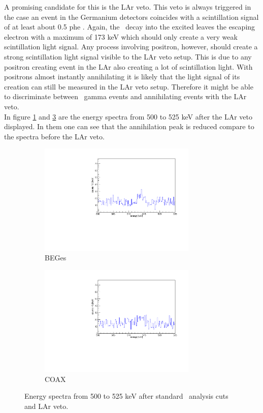 \documentclass[encoding=utf8,british]{tumphthesis}
\begin{document}
A promising candidate for this is the LAr veto.
This veto is always triggered in the case an event in the Germanium detectors coincides with a scintillation signal of at least about 0.5 phe \cite{agostini_background_2017}.
Again, the \Kr\ decay into the excited  leaves the escaping electron with a maximum of 173 keV which should only create a very weak scintillation light signal.
Any process involving positron, however, should create a strong scintillation light signal visible to the LAr veto setup.
This is due to any positron creating event in the LAr also creating a lot of  scintillation light.
With positrons almost instantly  annihilating it is likely that the light signal of its creation can still be measured in the LAr veto setup.
Therefore it might be able to discriminate between \Kr\ gamma events and annihilating events with the LAr veto.
\\

In figure \ref{fig:LArBEGes} and \ref{fig:LArCOAX} are the energy spectra from 500 to 525 keV after the LAr veto displayed.
In them one can see that the annihilation peak is reduced compare to the spectra before the LAr veto.
\\

\begin{figure}[t!]
\centering
\begin{subfigure}{0.475\textwidth}
	\includegraphics[width=75mm]{./Bilder/500525LArVetoBEGes.pdf}
    \caption{BEGes}
  \label{fig:LArBEGes}
\end{subfigure}\hfill%
\begin{subfigure}{0.475\textwidth}
	\includegraphics[width=75mm]{./Bilder/500525LArVetoCOAX.pdf}
  \caption{COAX}
  \label{fig:LArCOAX}
\end{subfigure}
    \caption{Energy spectra from 500 to 525 keV after standard \gerda\ analysis cuts and LAr veto.}
\end{figure}
\end{document}
